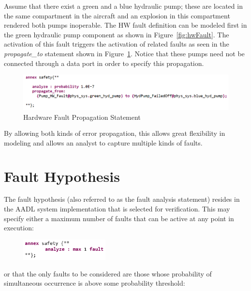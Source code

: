 Assume that there exist a green and a blue hydraulic pump; these are located in the same compartment in the aircraft and an explosion in this compartment rendered both pumps inoperable. 
The HW fault definition can be modeled first in the green hydraulic pump component as shown in Figure~\ref{fig:hwFault}. The activation of this fault triggers the activation of related faults as seen in the \textit{propagate\_to} statement shown in Figure~\ref{fig:hwFaultProp}. 
Notice that these pumps need not be connected through a data port in order to specify this propagation. 

\begin{figure}[h!]
	\begin{center}
		\includegraphics[width=1.0\textwidth]{images/hw_prop_stmt.png}
	\end{center}
	\vspace{-0.1in}
	\caption{Hardware Fault Propagation Statement}
	\label{fig:hwFaultProp}
\end{figure}

By allowing both kinds of error propagation, this allows great flexibility in modeling and allows an analyst to capture multiple kinds of faults. 


\section{Fault Hypothesis}
The fault hypothesis (also referred to as the fault analysis statement) resides in the AADL system implementation that is selected for verification. This may specify either a maximum number of faults that can be active at any point in execution:

\begin{figure}[h!]
	\vspace{-0.1in}
		\includegraphics[width=0.4\textwidth]{images/hypothesisMaxN.png}
	\vspace{-0.1in}
	\label{fig:hypothesisMaxN}
\end{figure}
or that the only faults to be considered are those whose probability of simultaneous occurrence is above some probability threshold: 

